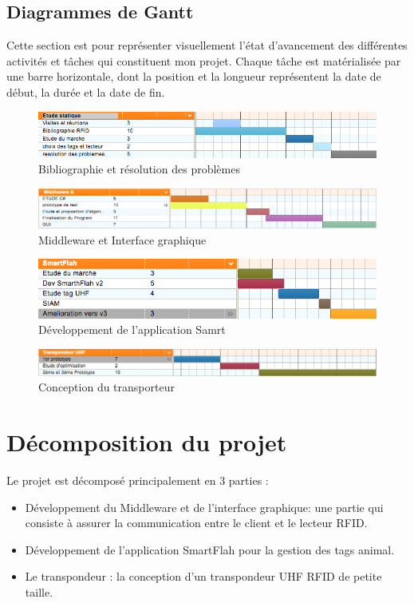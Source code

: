\documentclass[11pt, a4paper, twoside]{book}
\begin{document}
\subsection{Diagrammes	de	Gantt}
Cette section est pour représenter visuellement l'état d'avancement des différentes activités et tâches qui constituent mon projet. Chaque tâche est matérialisée par une barre horizontale, dont la position et la longueur représentent la date de début, la durée et la date de fin.
\begin{figure}[H]
\centering
\includegraphics[width=\textwidth]{etudestatic}
\caption{Bibliographie et résolution des problèmes}

\end{figure}
\begin{figure}[H]
\centering
\includegraphics[width=\textwidth]{mid}
\caption{Middleware et Interface graphique}

\end{figure}
\begin{figure}[H]
\centering
\includegraphics[width=\textwidth]{smart}
\caption{Développement de l'application Samrt}

\end{figure}
\begin{figure}[H]
\centering
\includegraphics[width=\textwidth]{trans}
\caption{Conception du transporteur}

\end{figure}

\section{Décomposition du projet}
Le projet est décomposé principalement en 3 parties :
\begin{itemize}
\item Développement du Middleware et de l'interface graphique: une partie qui consiste à assurer la communication entre le client et le lecteur RFID.
\item Développement de l'application SmartFlah pour la gestion des tags animal.
\item Le transpondeur : la conception d'un transpondeur UHF RFID de petite taille.\\
\end{itemize}
\end{document}
